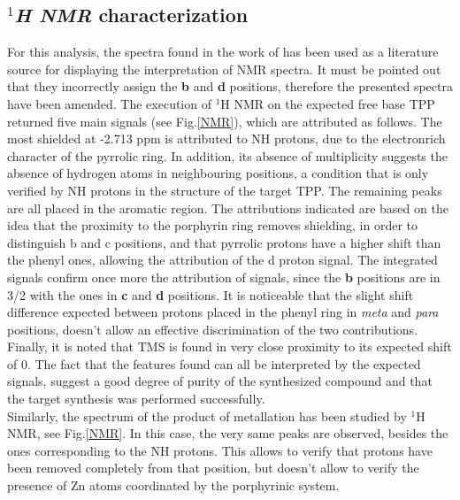 \documentclass[num-refs]{wiley-article}
\begin{document}
\subsection{\textit{$^{1}$H NMR} characterization}
For this analysis, the spectra found in the work of \citet{anjali_zinc-tetraphenylporphyrin_2020} has been used as a literature source for displaying the interpretation of NMR spectra.
It must be pointed out that they incorrectly assign the \textbf{b} and \textbf{d} positions, therefore the presented spectra have been amended.
The execution of $^{1}$H NMR on the expected free base TPP returned five main signals (see Fig.\ref{NMR}), which are attributed as follows.
The most shielded at -2.713 ppm is attributed to NH protons, due to the electronrich character of the pyrrolic ring. 
In addition, its absence of multiplicity suggests the absence of hydrogen atoms in neighbouring positions, a condition that is only verified by NH protons in the structure of the target TPP.
The remaining peaks are all placed in the aromatic region.
The attributions indicated are based on the idea that the proximity to the porphyrin ring removes shielding, in order to distinguish b and c positions, and that pyrrolic protons have a higher shift than the phenyl ones, allowing the attribution of the d proton signal.
The integrated signals confirm once more the attribution of signals, since the \textbf{b} positions are in 3/2 with the ones in \textbf{c} and \textbf{d} positions.
It is noticeable that the slight shift difference expected between protons placed in the phenyl ring in \textit{meta} and \textit{para} positions, doesn't allow an effective discrimination of the two contributions.
Finally, it is noted that TMS is found in very close proximity to its expected shift of 0.
The fact that the features found can all be interpreted by the expected signals, suggest a good degree of purity of the synthesized compound and that the target synthesis was performed successfully.\\
Similarly, the spectrum of the product of metallation has been studied by $^{1}$H NMR, see Fig.\ref{NMR}.
In this case, the very same peaks are observed, besides the ones corresponding to the NH protons.
This allows to verify that protons have been removed completely from that position, but doesn't allow to verify the presence of Zn atoms coordinated by the porphyrinic system.
\end{document}
